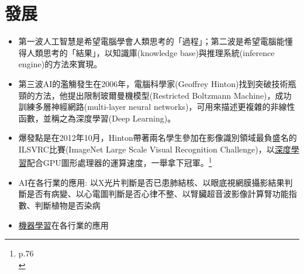 \documentclass[a4paper,12pt]{article}
\begin{document}
\section{發展}
\label{sec:org3044b04}
\begin{itemize}
\item 第一波人工智慧是希望電腦學會人類思考的「過程」；第二波是希望電腦能懂得人類思考的「結果」，以知識庫(knowledge base)與推理系統(inference engine)的方法來實現。\\
\item 第三波AI的濫觴發生在2006年，電腦科學家(Geoffrey Hinton)找到突破技術瓶頸的方法，他提出限制玻爾曼機模型(Restricted Boltzmann Machine)，成功訓練多層神經網路(multi-layer neural networks)，可用來描述更複雜的非線性函數，並稱之為深度學習(Deep Learning)。\\
\item 爆發點是在2012年10月，Hinton帶著兩名學生參加在影像識別領域最負盛名的ILSVRC比賽(ImageNet Large Scale Visual Recognition Challenge)，以\href{20221023101228-深度學習.org}{深度學習}配合GPU圖形處理器的運算速度，一舉拿下冠軍。\footnote{p.76\\}\\
\item AI在各行業的應用: 以X光片判斷是否已患肺結核、以眼底視網膜攝影結果判斷是否有病變、以心電圖判斷是否心律不整、以腎臟超音波影像計算腎功能指數、判斷植物是否染病\\
\item \href{20221023101456-機器學習.org}{機器學習}在各行業的應用\\
\begin{figure}[htbp]
\centering

\end{figure}
\end{itemize}
\end{document}
